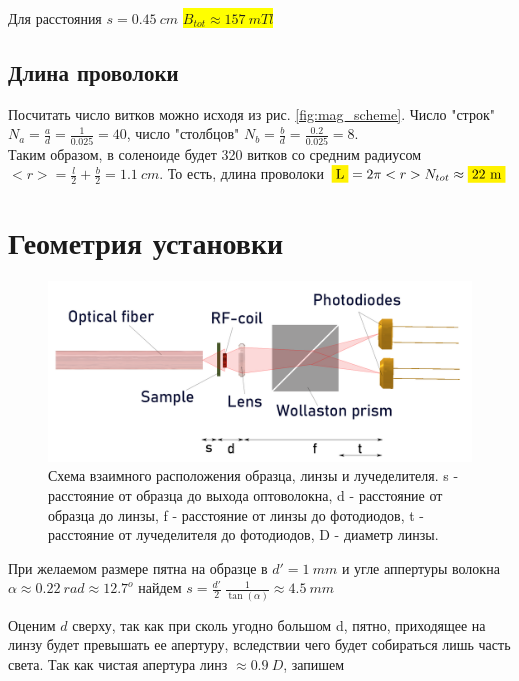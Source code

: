 \documentclass[10pt]{article}
\begin{document}
Для расстояния $s = 0.45\ cm$ \colorbox{yellow}{$B_{tot} \approx 157\ mTl$}

\subsection{Длина проволоки}

Посчитать число витков можно исходя из рис. \ref{fig:mag_scheme}. Число "строк" $N_a = \frac{a}{d} = \frac{1}{0.025} = 40$, число "столбцов" $N_b = \frac{b}{d} = \frac{0.2}{0.025} = 8$. \\

Таким образом, в соленоиде будет 320 витков со средним радиусом $<r> = \frac{l}{2} + \frac{b}{2} = 1.1\ cm$. То есть, длина проволоки $\colorbox{yellow}{L} = 2 \pi <r> N_{tot} \approx \colorbox{yellow}{22\ m}$

\section{Геометрия установки}\label{geometry}

\begin{figure}[h!]
	\centering
	\includegraphics[scale = 0.18]{ray_spread.png}
	\caption{\footnotesize Схема взаимного расположения образца, линзы и лучеделителя. s - расстояние от образца до выхода оптоволокна, d - расстояние от образца до линзы, f - расстояние от линзы до фотодиодов, t - расстояние от лучеделителя до фотодиодов, D - диаметр линзы. \normalsize}
	\label{fig:ray_spread}
\end{figure}

При желаемом размере пятна на образце в $d' = 1\ mm$ и угле аппертуры волокна $\alpha \approx 0.22\ rad \approx 12.7^{o} $ найдем $s = \frac{d'}{2}\ \frac{1}{\tan(\alpha)} \approx 4.5\ mm$

Оценим $d$ сверху, так как при сколь угодно большом d, пятно, приходящее на линзу будет превышать ее апертуру, вследствии чего будет собираться лишь часть света. Так как чистая апертура линз $\approx 0.9\ D$, запишем
\end{document}
